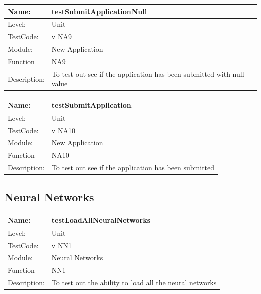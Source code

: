 \documentclass[12pt]{article}
\begin{document}
\begin{flushleft}
\begin{center}
\begin{tabular}{|l|p{12cm}|}
\hline

 Name: & testSubmitApplicationNull  \\
\hline
Level: & Unit \\
\hline
TestCode: & v NA9 \\
\hline
Module:& New Application\\
\hline
Function & NA9 \\
\hline
Description: & To test out see if the application has been submitted with null value  \\
\hline

\end{tabular}
\end{center}


\begin{center}
\begin{tabular}{|l|p{12cm}|}
\hline

 Name: & testSubmitApplication \\
\hline
Level: & Unit \\
\hline
TestCode: & v NA10 \\
\hline
Module:& New Application\\
\hline
Function & NA10 \\
\hline
Description: & To test out see if the application has been submitted   \\
\hline

\end{tabular}
\end{center}

\subsection{Neural Networks}

\begin{center}
\begin{tabular}{|l|p{12cm}|}
\hline

 Name: & testLoadAllNeuralNetworks \\
 \hline
Level: & Unit \\
\hline
TestCode: & v NN1 \\
\hline
Module:& Neural Networks \\
\hline
Function & NN1 \\
\hline
Description: & To test out the ability to load all the neural networks  \\
\hline
\end{tabular}
\end{center}


\end{flushleft}
\end{document}
